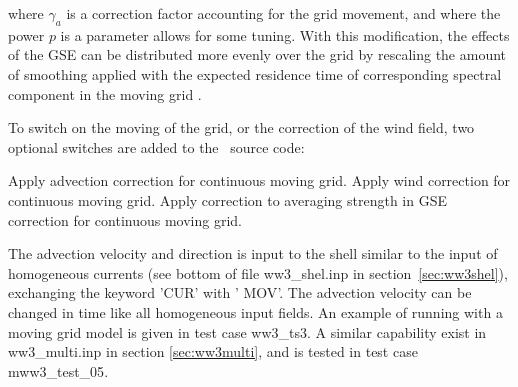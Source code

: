 \noindent
where $\gamma_a$ is a correction factor accounting for the grid movement, and
where the power $p$ is a parameter allows for some tuning. With this
modification, the effects of the GSE can be distributed more evenly over the
grid by rescaling the amount of smoothing applied with the expected residence
time of corresponding spectral component in the moving grid
\citep[see][]{tol:OMOD05b}.

\vspace{\baselineskip} 
\vspace{\baselineskip} 
\vspace{\baselineskip} 

\noindent
To switch on the moving of the grid, or the correction of the wind field, two
optional switches are added to the \ws\ source code:

\begin{slist}
 {Apply advection correction for continuous moving grid.}
 {Apply wind correction for continuous moving grid.}
 {Apply correction to averaging strength in GSE correction for
           continuous moving grid.}
\end{slist}

\noindent
The advection velocity and direction is input to the shell similar to the
input of homogeneous currents (see bottom of file {\file ww3\_shel.inp} in
section~\ref{sec:ww3shel}), exchanging the keyword '{\code CUR}' with '{\code
  MOV}'. The advection velocity can be changed in time like all homogeneous
input fields. An example of running with a moving grid model is given in test
case {\file ww3\_ts3}. A similar capability exist in {\file ww3\_multi.inp} in
section \ref{sec:ww3multi}, and is tested in test case {\file mww3\_test\_05}.
